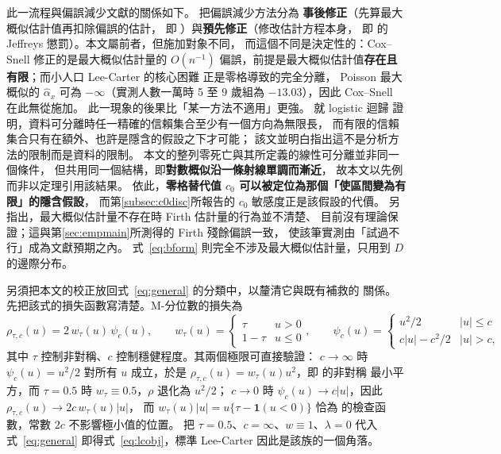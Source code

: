 \documentclass[UTF8, fontset=macnew, a4paper, 12pt]{ctexart}
\begin{document}
此一流程與偏誤減少文獻的關係如下。\citet{firth1993} 把偏誤減少方法分為
\textbf{事後修正}（先算最大概似估計值再扣除偏誤的估計，
即 \citealp{coxsnell1968}）與\textbf{預先修正}（修改估計方程本身，
即 \citealp{firth1993} 的 Jeffreys 懲罰）。本文屬前者，但施加對象不同，
而這個不同是決定性的：Cox--Snell 修正的是最大概似估計量的 $O(n^{-1})$
偏誤，前提是最大概似估計值\textbf{存在且有限}；而小人口 Lee-Carter 的核心困難
正是零格導致的完全分離\citep{albert1984}，
Poisson 最大概似的 $\hat\alpha_x$ 可為 $-\infty$（實測人數一萬時
5 至 9 歲組為 $-13.03$），因此 Cox--Snell 在此無從施加。
此一現象的後果比「某一方法不適用」更強。\citet{lewis2024} 就 logistic 迴歸
證明，資料可分離時任一精確的信賴集合至少有一個方向為無限長，
而有限的信賴集合只有在額外、也許是隱含的假設之下才可能；
該文並明白指出這不是分析方法的限制而是資料的限制。
本文的整列零死亡與其所定義的線性可分離並非同一個條件，
但共用同一個結構，即\textbf{對數概似沿一條射線單調而漸近}，
故本文以先例而非以定理引用該結果。
依此，\textbf{零格替代值 $c_0$ 可以被定位為那個「使區間變為有限」的隱含假設}，
而第\ref{subsec:c0disc}所報告的 $c_0$ 敏感度正是該假設的代價。
\citet{lewis2024} 另指出，最大概似估計量不存在時 Firth 估計量的行為並不清楚、
目前沒有理論保證；這與第\ref{sec:empmain}所測得的 Firth 殘餘偏誤一致，
使該筆實測由「試過不行」成為文獻預期之內。
式~\eqref{eq:bform} 則完全不涉及最大概似估計量，只用到 $D$ 的邊際分布。


另須把本文的校正放回式~\eqref{eq:general} 的分類中，以釐清它與既有補救的
關係。先把該式的損失函數寫清楚。M-分位數的損失為
\begin{equation}\label{eq:mq}
\rho_{\tau,c}(u)=2\,w_\tau(u)\,\psi_c(u),\qquad
w_\tau(u)=\begin{cases}\tau & u>0\\ 1-\tau & u\le 0\end{cases},\qquad
\psi_c(u)=\begin{cases}u^2/2 & |u|\le c\\ c|u|-c^2/2 & |u|>c,\end{cases}
\end{equation}
其中 $\tau$ 控制非對稱、$c$ 控制穩健程度。其兩個極限可直接驗證：
$c\to\infty$ 時 $\psi_c(u)=u^2/2$ 對所有 $u$ 成立，於是
$\rho_{\tau,c}(u)=w_\tau(u)u^2$，即 \citet{newey1987}的非對稱
最小平方，而 $\tau=0.5$ 時 $w_\tau\equiv0.5$，$\rho$ 退化為 $u^2/2$；
$c\to0$ 時 $\psi_c(u)\to c|u|$，因此 $\rho_{\tau,c}(u)\to 2c\,w_\tau(u)|u|$，
而 $w_\tau(u)|u|=u\{\tau-\mathbf{1}(u<0)\}$ 恰為 \citet{koenker1978}
的檢查函數，常數 $2c$ 不影響極小值的位置。
把 $\tau=0.5$、$c=\infty$、$w\equiv1$、$\lambda=0$ 代入式~\eqref{eq:general}
即得式~\eqref{eq:lcobj}，標準 Lee-Carter 因此是該族的一個角落。
\end{document}
